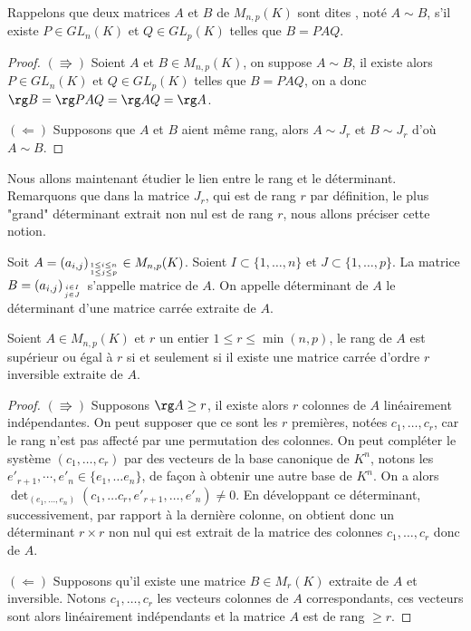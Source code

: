 \documentclass[class=report,crop=false]{standalone}
\begin{document}
Rappelons que deux matrices $A$ et $B$ de $M_{n,p}(K)$ 
sont dites , noté $A\sim B$, 
s'il existe $P\in GL_n(K)$ et $Q\in GL_p(K)$ telles que $B=PAQ$.

\begin{proof}

$(\Rrightarrow)$ Soient $A$ et $B\in M_{n,p}(K)$, on 
suppose $A\sim B$, il existe alors $P\in GL_n(K)$ et 
$Q\in GL_p(K)$ telles que $B=PAQ$, on a donc $\rg B=\rg PAQ=\rg AQ=\rg A$.

$(\Leftarrow)$ Supposons que $A$ et $B$ aient même rang, 
alors $A\sim J_r$ et $B\sim J_r$ d'où $A\sim B$.

\end{proof} 

Nous allons maintenant étudier le lien entre le rang et le déterminant. 
Remarquons que dans la matrice $J_r$, qui est de rang $r$ par définition, 
le plus "grand" déterminant extrait non nul est de rang $r$, 
nous allons préciser cette notion.

\begin{definition}
Soit $\displaystyle A=(a_{i,j})_{{1\leq i\leq n}\atop{1\leq j\leq p}}\in M_{n,p}(K)$. 
Soient $I\subset\{1,\dots,n\}$ et $J\subset\{1,\dots,p\}$. 
La matrice $\displaystyle B=(a_{i,j})_{{i\in I}\atop{j\in J}}$  
s'appelle matrice  de $A$.
On appelle déterminant  de $A$ le déterminant 
d'une matrice carrée extraite de $A$.
\end{definition}

\begin{theoreme}
Soient $A\in M_{n,p}(K)$ et $r$ un entier $1\leq r\leq \min(n,p)$, 
le rang de $A$ est supérieur ou égal à $r$ si et seulement si il 
existe une matrice carrée d'ordre $r$ inversible extraite de $A$.
\end{theoreme} 

\begin{proof}
$(\Rrightarrow)$ Supposons $\rg A\geq r$, il existe alors $r$ colonnes 
de $A$ linéairement indépendantes. On peut supposer que ce sont les $r$ 
premières, notées $c_1,\dots,c_r$, car le rang n'est pas affecté par 
une permutation des colonnes.  On peut compléter le système $(c_1,\dots,c_r)$ 
par des vecteurs de la base canonique de $K^n$, notons les 
$e'_{r+1},\cdots,e'_n\in\{e_1,\dots e_n\}$, de façon à obtenir une 
autre base de $K^n$. On a alors 
$\det_{(e_1,\dots,e_n)}(c_1,\dots c_r,e'_{r+1},\dots,e'_n)\neq 0.$
En développant ce déterminant, successivement, par rapport à la dernière 
colonne, on obtient donc un déterminant $r\times r$ non nul qui est 
extrait de la matrice des colonnes $c_1,\dots,c_r$ donc de $A$.

$(\Leftarrow)$ Supposons qu'il existe une matrice $B\in M_r(K)$ 
extraite de $A$ et inversible. Notons $c_1,\dots, c_r$ les vecteurs 
colonnes de $A$ correspondants, ces vecteurs sont alors linéairement 
indépendants et la matrice $A$ est de rang $\geq r$. 
\end{proof}
\end{document}
